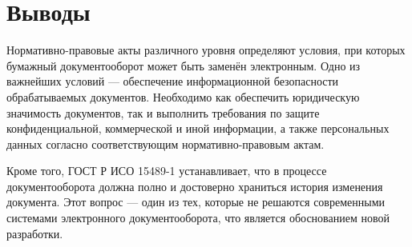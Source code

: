 \section{Выводы} \label{rights_conclusion}

Нормативно-правовые акты различного уровня определяют условия, при которых бумажный документооборот может быть заменён электронным. Одно из важнейших условий --- обеспечение информационной безопасности обрабатываемых документов. Необходимо как обеспечить юридическую значимость документов, %
так и выполнить требования по защите конфиденциальной, коммерческой и иной информации, а также персональных данных согласно соответствующим нормативно-правовым актам.

Кроме того, ГОСТ Р ИСО 15489-1 устанавливает, что в процессе документооборота должна полно и достоверно храниться история изменения документа. Этот вопрос --- один из тех, которые не решаются современными системами электронного документооборота, что является обоснованием новой разработки.

